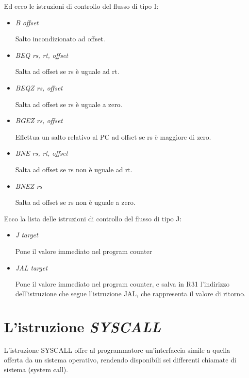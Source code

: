 \documentclass[letterpaper,10pt,english]{sphinxmanual}
\begin{document}
Ed ecco le istruzioni di controllo del flusso di tipo I:
\begin{itemize}
\item {} 
\emph{B offset}

Salto incondizionato ad offset.

\item {} 
\emph{BEQ rs, rt, offset}

Salta ad offset se rs è uguale ad rt.

\item {} 
\emph{BEQZ rs, offset}

Salta ad offset se rs è uguale a zero.

\end{itemize}
\begin{itemize}
\item {} 
\emph{BGEZ rs, offset}

Effettua un salto relativo al PC ad offset se rs è maggiore di zero.

\item {} 
\emph{BNE rs, rt, offset}

Salta ad offset se rs non è uguale ad rt.

\item {} 
\emph{BNEZ rs}

Salta ad offset se rs non è uguale a zero.

\end{itemize}

Ecco la lista delle istruzioni di controllo del flusso di tipo J:
\begin{itemize}
\item {} 
\emph{J target}

Pone il valore immediato nel program counter

\item {} 
\emph{JAL target}

Pone il valore immediato nel program counter, e salva in R31 l'indirizzo
dell'istruzione che segue l'istruzione JAL, che rappresenta il valore di
ritorno.

\end{itemize}


\section{L'istruzione \emph{SYSCALL}}
\label{instructions:l-istruzione-syscall}
L'istruzione SYSCALL offre al programmatore un'interfaccia simile a quella
offerta da un sistema operativo, rendendo disponibili sei differenti chiamate
di sistema (system call).
\end{document}
